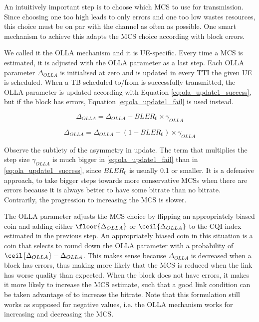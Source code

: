An intuitively important step is to choose which MCS to use for transmission. Since choosing one too high leads to only errors and one too low wastes resources, this choice must be on par with the channel as often as possible. One smart mechanism to achieve this adapts the MCS choice according with block errors.

We called it the \ac{OLLA} mechanism and it is UE-specific. Every time a MCS is estimated, it is adjusted with the OLLA parameter as a last step. Each OLLA parameter $\Delta_{OLLA}$ is initialised at zero and is updated in every TTI the given UE is scheduled. When a \ac{TB} scheduled to/from is successfully transmitted, the OLLA parameter is updated according with Equation \eqref{eq:ola_update1_success}, but if the block has errors, Equation \eqref{eq:ola_update1_fail} is used instead.


\begin{equation} \label{eq:ola_update1_success}
    \Delta_{OLLA} = \Delta_{OLLA} + BLER_0 \times \gamma_{OLLA}
\end{equation}

\begin{equation} \label{eq:ola_update1_fail}
    \Delta_{OLLA} = \Delta_{OLLA} - (1 - BLER_0) \times \gamma_{OLLA}
\end{equation}


Observe the subtlety of the asymmetry in update. The term that multiplies the step size $\gamma_{OLLA}$ is much bigger in \eqref{eq:ola_update1_fail} than in \eqref{eq:ola_update1_success}, since $BLER_0$ is usually 0.1 or smaller. It is a defensive approach, to take bigger steps towards more conservative MCSs when there are errors because it is always better to have some bitrate than no bitrate. Contrarily, the progression to increasing the MCS is slower. 


The OLLA parameter adjusts the MCS choice by flipping an appropriately biased coin and adding either $\floor{\Delta_{OLLA}}$ or $\ceil{\Delta_{OLLA}}$ to the CQI index estimated in the previous step. An appropriately biased coin in this situation is a coin that selects to round down the OLLA parameter with a probability of $\ceil{\Delta_{OLLA}} - \Delta_{OLLA}$. This makes sense because $\Delta_{OLLA}$ is decreased when a block has errors, thus making more likely that the MCS is reduced when the link has worse quality than expected. When the block does not have errors, it makes it more likely to increase the MCS estimate, such that a good link condition can be taken advantage of to increase the bitrate. Note that this formulation still works as supposed for negative values, i.e. the OLLA mechanism works for increasing and decreasing the MCS.


